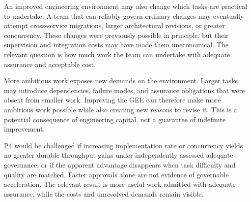 
An improved engineering environment may also change which tasks are practical to undertake. A team that can reliably govern ordinary changes may eventually attempt cross-service migrations, larger architectural revisions, or greater concurrency. These changes were previously possible in principle, but their supervision and integration costs may have made them uneconomical. The relevant question is how much work the team can undertake with adequate assurance and acceptable cost.

More ambitious work exposes new demands on the environment. Larger tasks may introduce dependencies, failure modes, and assurance obligations that were absent from smaller work. Improving the GEE can therefore make more ambitious work possible while also creating new reasons to revise it. This is a potential consequence of engineering capital, not a guarantee of indefinite improvement.


P4 would be challenged if increasing implementation rate or concurrency yields no greater durable throughput gains under independently assessed adequate governance, or if the apparent advantage disappears when task difficulty and quality are matched. Faster approvals alone are not evidence of governable acceleration. The relevant result is more useful work admitted with adequate assurance, while the costs and unresolved demands remain visible.
